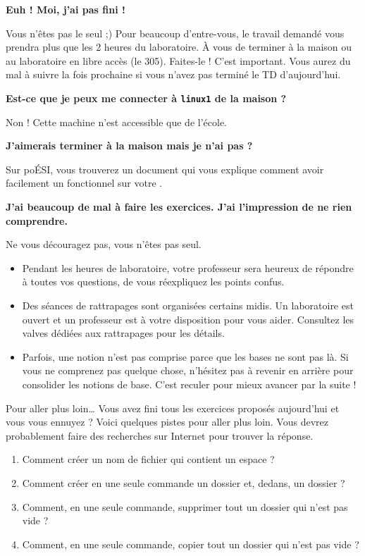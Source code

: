 \documentclass[a4paper,11pt]{style-esi/td}
\begin{document}
	\begin{faq}
		\textbf{Euh ! Moi, j'ai pas fini !}
		
		Vous n'êtes pas le seul ;)
		Pour beaucoup d'entre-vous, 
		le travail demandé vous prendra plus que les 2 heures du laboratoire.
		À vous de terminer à la maison ou au laboratoire en libre accès (le 305).
		Faites-le ! C'est important.
		Vous aurez du mal à suivre la fois prochaine 
		si vous n'avez pas terminé le TD d'aujourd'hui.
		
		\medskip
		\textbf{Est-ce que je peux me connecter à \texttt{linux1} de la maison ?}
		
		Non ! Cette machine n'est accessible que de l'école.

		\medskip
		\textbf{J'aimerais terminer à la maison mais je n'ai pas  ?}
		
		Sur poÉSI, vous trouverez un document qui vous explique
		comment avoir facilement un  fonctionnel sur votre .

		\medskip
		\textbf{J'ai beaucoup de mal à faire les exercices. 
			J'ai l'impression de ne rien comprendre.}
		
		Ne vous découragez pas, vous n'êtes pas seul.
		\begin{itemize}
		\item 
			Pendant les heures de laboratoire, 
			votre professeur sera heureux de répondre à toutes vos questions,
			de vous réexpliquez les points confus.
		\item 
			Des séances de rattrapages sont organisées certains midis.
			Un laboratoire est ouvert et un professeur est à votre disposition
			pour vous aider. 
			Consultez les valves dédiées aux rattrapages pour les détails.
		\item 
			Parfois, une notion n'est pas comprise 
			parce que les bases ne sont pas là.
			Si vous ne comprenez pas quelque chose,
			n'hésitez pas à revenir en arrière pour consolider les notions de base.
			C'est reculer pour mieux avancer par la suite !
		\end{itemize}
	\end{faq}

	\begin{Exercice}{Pour aller plus loin\dots}
		Vous avez fini tous les exercices proposés aujourd'hui
		et vous vous ennuyez ?
		Voici quelques pistes pour aller plus loin.
		Vous devrez probablement faire des recherches sur Internet
		pour trouver la réponse.
		\begin{enumerate}
		\item 
			Comment créer un nom de fichier qui contient un espace ?
		\item 
			Comment créer en une seule commande un dossier 
			et, dedans, un dossier  ?
		\item 
			Comment, en une seule commande, 
			supprimer tout un dossier qui n'est pas vide ?
		\item 
			Comment, en une seule commande, 
			copier tout un dossier qui n'est pas vide ?
		\end{enumerate}
	\end{Exercice}
\end{document}
